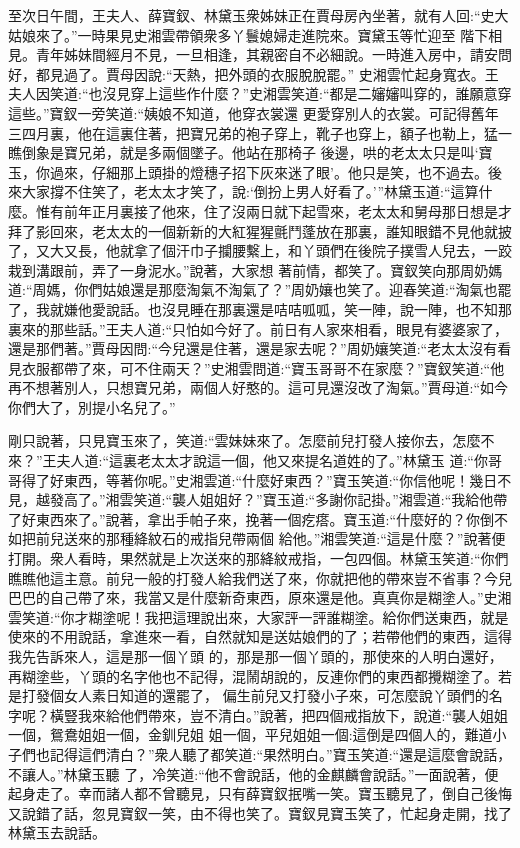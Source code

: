 \begin{parag}
    至次日午間，王夫人、薛寶釵、林黛玉衆姊妹正在賈母房內坐著，就有人回:“史大姑娘來了。”一時果見史湘雲帶領衆多丫鬟媳婦走進院來。寶黛玉等忙迎至 階下相見。青年姊妹間經月不見，一旦相逢，其親密自不必細說。一時進入房中，請安問好，都見過了。賈母因說:“天熱，把外頭的衣服脫脫罷。” 史湘雲忙起身寬衣。王夫人因笑道:“也沒見穿上這些作什麼？”史湘雲笑道:“都是二嬸嬸叫穿的，誰願意穿這些。”寶釵一旁笑道:“姨娘不知道，他穿衣裳還 更愛穿別人的衣裳。可記得舊年三四月裏，他在這裏住著，把寶兄弟的袍子穿上，靴子也穿上，額子也勒上，猛一瞧倒象是寶兄弟，就是多兩個墜子。他站在那椅子 後邊，哄的老太太只是叫‘寶玉，你過來，仔細那上頭掛的燈穗子招下灰來迷了眼’。他只是笑，也不過去。後來大家撐不住笑了，老太太才笑了，說:‘倒扮上男人好看了。’”林黛玉道:“這算什麼。惟有前年正月裏接了他來，住了沒兩日就下起雪來，老太太和舅母那日想是才拜了影回來，老太太的一個新新的大紅猩猩氈鬥蓬放在那裏，誰知眼錯不見他就披了，又大又長，他就拿了個汗巾子攔腰繫上，和丫頭們在後院子撲雪人兒去，一跤栽到溝跟前，弄了一身泥水。”說著，大家想 著前情，都笑了。寶釵笑向那周奶媽道:“周媽，你們姑娘還是那麼淘氣不淘氣了？”周奶孃也笑了。迎春笑道:“淘氣也罷了，我就嫌他愛說話。也沒見睡在那裏還是咭咭呱呱，笑一陣，說一陣，也不知那裏來的那些話。”王夫人道:“只怕如今好了。前日有人家來相看，眼見有婆婆家了，還是那們著。”賈母因問:“今兒還是住著，還是家去呢？”周奶孃笑道:“老太太沒有看見衣服都帶了來，可不住兩天？”史湘雲問道:“寶玉哥哥不在家麼？”寶釵笑道:“他再不想著別人，只想寶兄弟，兩個人好憨的。這可見還沒改了淘氣。”賈母道:“如今你們大了，別提小名兒了。”
\end{parag}


\begin{parag}
    剛只說著，只見寶玉來了，笑道:“雲妹妹來了。怎麼前兒打發人接你去，怎麼不來？”王夫人道:“這裏老太太才說這一個，他又來提名道姓的了。”林黛玉 道:“你哥哥得了好東西，等著你呢。”史湘雲道:“什麼好東西？”寶玉笑道:“你信他呢！幾日不見，越發高了。”湘雲笑道:“襲人姐姐好？”寶玉道:“多謝你記掛。”湘雲道:“我給他帶了好東西來了。”說著，拿出手帕子來，挽著一個疙瘩。寶玉道:“什麼好的？你倒不如把前兒送來的那種絳紋石的戒指兒帶兩個 給他。”湘雲笑道:“這是什麼？”說著便打開。衆人看時，果然就是上次送來的那絳紋戒指，一包四個。林黛玉笑道:“你們瞧瞧他這主意。前兒一般的打發人給我們送了來，你就把他的帶來豈不省事？今兒巴巴的自己帶了來，我當又是什麼新奇東西，原來還是他。真真你是糊塗人。”史湘雲笑道:“你才糊塗呢！我把這理說出來，大家評一評誰糊塗。給你們送東西，就是使來的不用說話，拿進來一看，自然就知是送姑娘們的了；若帶他們的東西，這得我先告訴來人，這是那一個丫頭 的，那是那一個丫頭的，那使來的人明白還好，再糊塗些，丫頭的名字他也不記得，混鬧胡說的，反連你們的東西都攪糊塗了。若是打發個女人素日知道的還罷了， 偏生前兒又打發小子來，可怎麼說丫頭們的名字呢？橫豎我來給他們帶來，豈不清白。”說著，把四個戒指放下，說道:“襲人姐姐一個，鴛鴦姐姐一個，金釧兒姐 姐一個，平兒姐姐一個:這倒是四個人的，難道小子們也記得這們清白？”衆人聽了都笑道:“果然明白。”寶玉笑道:“還是這麼會說話，不讓人。”林黛玉聽 了，冷笑道:“他不會說話，他的金麒麟會說話。”一面說著，便起身走了。幸而諸人都不曾聽見，只有薛寶釵抿嘴一笑。寶玉聽見了，倒自己後悔又說錯了話，忽見寶釵一笑，由不得也笑了。寶釵見寶玉笑了，忙起身走開，找了林黛玉去說話。
\end{parag}


